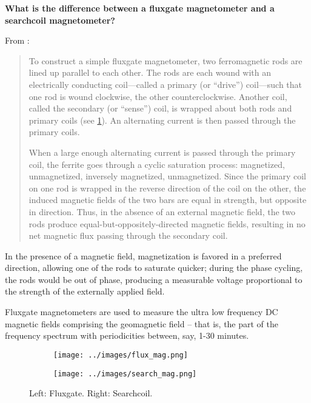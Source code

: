 \textbf{What is the difference between a fluxgate magnetometer and a searchcoil magnetometer?}

From \cite{Urban2010}:
\begin{quotation}
To construct a simple fluxgate magnetometer, two ferromagnetic rods are
lined up parallel to each other. The rods are each wound with an
electrically conducting coil---called a primary (or “drive”) coil---such
that one rod is wound clockwise, the other counterclockwise. Another
coil, called the secondary (or “sense”) coil, is wrapped about both rods
and primary coils (see \ref{fig2}). An alternating current is then
passed through the primary coils.

When a large enough alternating current is passed through the primary
coil, the ferrite goes through a cyclic saturation process: magnetized,
unmagnetized, inversely magnetized, unmagnetized. Since the primary coil on one rod is wrapped in the reverse direction of the coil on the other, the induced magnetic fields of the two bars are equal in strength, but opposite in direction. Thus, in the absence of an external
magnetic field, the two rods produce equal-but-oppositely-directed
magnetic fields, resulting in no net magnetic flux passing through the
secondary coil.
\end{quotation}

In the presence of a magnetic field, magnetization is favored in a
preferred direction, allowing one of the rods to saturate quicker;
during the phase cycling, the rods would be out of phase, producing a
measurable voltage proportional to the strength of the externally
applied field.

Fluxgate magnetometers are used to measure the ultra low frequency DC
magnetic fields comprising the geomagnetic field -- that is, the part of the frequency spectrum with periodicities between, say, 1-30 minutes.
\begin{figure}[h]
  \centering
  \begin{subfigure}[2a]{0.4\textwidth}
    \centering
    \texttt{[image: ../images/flux\_mag.png]}
  \end{subfigure}
  \hfill
  \begin{subfigure}[2b]{0.4\textwidth}
    \centering
    \texttt{[image: ../images/search\_mag.png]}
  \end{subfigure}
  \caption{Left: Fluxgate. Right: Searchcoil.}
  \label{fig2}
\end{figure}

